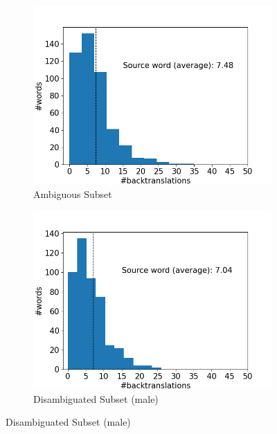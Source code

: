 \begin{figure}[!htb]
     \centering
     
     \begin{subfigure}{0.49\textwidth}
         \centering
         \includegraphics[width=\textwidth]{figures/alignment/align_10/word_backtranslations_original.png}
         \caption{Ambiguous Subset}
         \label{fig:alignment_backtranslation_ambiguous}
     \end{subfigure}
     \hfill
     \begin{subfigure}{0.49\textwidth}
         \centering
         \includegraphics[width=\textwidth]{figures/alignment/align_10/word_backtranslations_male.png}
         \caption{Disambiguated Subset (male)}

\end{subfigure}
\end{figure}
